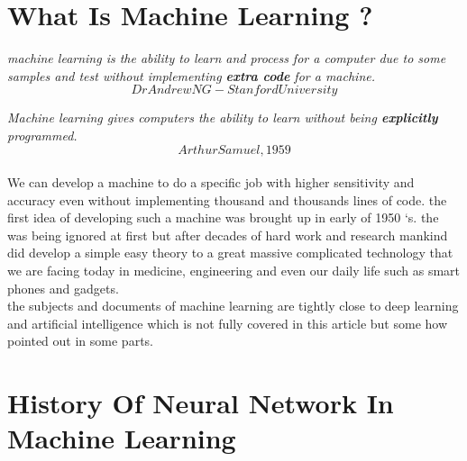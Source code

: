\documentclass[12pt , a4paper]{article}
\begin{document}
%

\newpage



\section {What Is Machine Learning ?}
\begin{displayquote}
\textit{machine learning is the ability to learn and process for a computer due to some samples and test without implementing \textbf{extra code} for a machine.}
\[ Dr Andrew NG  -  Stanford University \]

\textit{Machine learning gives computers the ability to learn without being \textbf{explicitly }programmed.}
\[ Arthur Samuel, 1959 \]
\end{displayquote}
\paragraph{} We can develop a machine to do a specific job with higher sensitivity and accuracy even without implementing thousand and thousands lines of code. the first idea of developing such a machine was brought up in early of 1950 ‘s. the was being ignored at first but after decades of hard work and research mankind did develop a simple easy theory to a great massive complicated technology that we are facing today in medicine, engineering and even our daily life such as smart phones and gadgets.\\
the subjects and documents of machine learning are tightly close to deep learning and artificial intelligence which is not fully covered in this article but some how pointed out in some parts.  \\

\section  { History Of Neural Network In Machine Learning }
 
\end{document}
